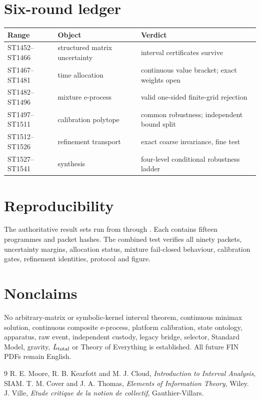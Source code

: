 \documentclass[11pt,a4paper]{article}
\begin{document}
\section{Six-round ledger}
\begin{longtable}{@{}p{}p{}p{}@{}}
\toprule
Range & Object & Verdict \\
\midrule\endhead
ST1452--ST1466 & structured matrix uncertainty & interval certificates survive \\
ST1467--ST1481 & time allocation & continuous value bracket; exact weights open \\
ST1482--ST1496 & mixture e-process & valid one-sided finite-grid rejection \\
ST1497--ST1511 & calibration polytope & common robustness; independent bound split \\
ST1512--ST1526 & refinement transport & exact coarse invariance, fine test \\
ST1527--ST1541 & synthesis & four-level conditional robustness ladder \\
\bottomrule
\end{longtable}

\section{Reproducibility}
The authoritative result sets run from
 through
.  Each contains fifteen programmes and
packet hashes.  The combined test  verifies all
ninety packets, uncertainty margins, allocation status, mixture fail-closed
behaviour, calibration gates, refinement identities, protocol and figure.

\section{Nonclaims}
No arbitrary-matrix or symbolic-kernel interval theorem, continuous minimax
solution, continuous composite e-process, platform calibration, state ontology,
apparatus, raw event, independent custody, legacy bridge, selector, Standard
Model, gravity, $L_{\rm total}$ or Theory of Everything is established.  All
future FIN PDFs remain English.

\begin{thebibliography}{9}
 R. E. Moore, R. B. Kearfott and M. J. Cloud, \emph{Introduction to Interval Analysis}, SIAM.
 T. M. Cover and J. A. Thomas, \emph{Elements of Information Theory}, Wiley.
 J. Ville, \emph{Etude critique de la notion de collectif}, Gauthier-Villars.
\end{thebibliography}
\end{document}
